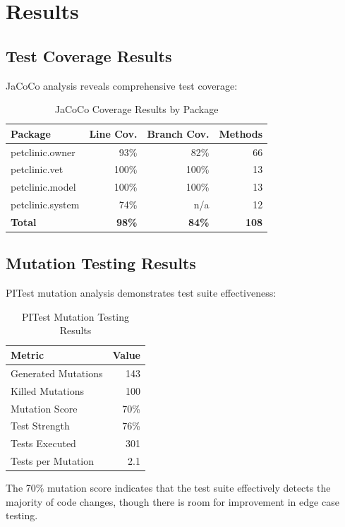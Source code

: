 \documentclass[sigconf]{acmart}
\begin{document}
\section{Results}

\subsection{Test Coverage Results}

JaCoCo analysis reveals comprehensive test coverage:

\begin{table}[h]
\caption{JaCoCo Coverage Results by Package}
\begin{tabular}{lrrr}
\toprule
\textbf{Package} & \textbf{Line Cov.} & \textbf{Branch Cov.} & \textbf{Methods} \\
\midrule
petclinic.owner & 93\% & 82\% & 66 \\
petclinic.vet & 100\% & 100\% & 13 \\
petclinic.model & 100\% & 100\% & 13 \\
petclinic.system & 74\% & n/a & 12 \\
\midrule
\textbf{Total} & \textbf{98\%} & \textbf{84\%} & \textbf{108} \\
\bottomrule
\end{tabular}
\end{table}

\subsection{Mutation Testing Results}

PITest mutation analysis demonstrates test suite effectiveness:

\begin{table}[h]
\caption{PITest Mutation Testing Results}
\begin{tabular}{lr}
\toprule
\textbf{Metric} & \textbf{Value} \\
\midrule
Generated Mutations & 143 \\
Killed Mutations & 100 \\
Mutation Score & 70\% \\
Test Strength & 76\% \\
Tests Executed & 301 \\
Tests per Mutation & 2.1 \\
\bottomrule
\end{tabular}
\end{table}

The 70\% mutation score indicates that the test suite effectively detects the majority of code changes, though there is room for improvement in edge case testing.
\end{document}
